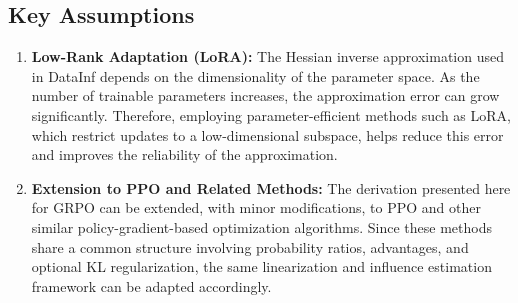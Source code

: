 \documentclass{article}
\begin{document}
\subsection{Key Assumptions}

\begin{enumerate}
    \item \textbf{Low-Rank Adaptation (LoRA):}  
    The Hessian inverse approximation used in DataInf depends on the dimensionality of the parameter space. As the number of trainable parameters increases, the approximation error can grow significantly. Therefore, employing parameter-efficient methods such as LoRA, which restrict updates to a low-dimensional subspace, helps reduce this error and improves the reliability of the approximation.

    \item \textbf{Extension to PPO and Related Methods:}  
    The derivation presented here for GRPO can be extended, with minor modifications, to PPO and other similar policy-gradient-based optimization algorithms. Since these methods share a common structure involving probability ratios, advantages, and optional KL regularization, the same linearization and influence estimation framework can be adapted accordingly.
\end{enumerate}













\end{document}
